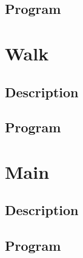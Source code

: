 \documentclass[11pt, a4paper]{article}
\begin{document}
\subsection{Program}

\clearpage
\section{Walk}
\subsection{Description}
\subsection{Program}

\clearpage
\section{Main}
\subsection{Description}
\subsection{Program}

\clearpage

\vspace{1.5cm}
\end{document}
